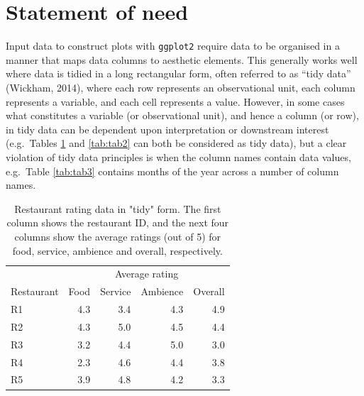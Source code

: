 \documentclass[10pt,a4paper,onecolumn]{article}
\begin{document}
\hypertarget{statement-of-need}{%
\section{Statement of need}\label{statement-of-need}}

Input data to construct plots with \texttt{ggplot2} require data to be
organised in a manner that maps data columns to aesthetic elements. This
generally works well where data is tidied in a long rectangular form,
often referred to as ``tidy data'' (Wickham, 2014), where each row
represents an observational unit, each column represents a variable, and
each cell represents a value. However, in some cases what constitutes a
variable (or observational unit), and hence a column (or row), in tidy
data can be dependent upon interpretation or downstream interest
(e.g.~Tables \ref{tab:tab1} and \ref{tab:tab2} can both be considered as
tidy data), but a clear violation of tidy data principles is when the
column names contain data values, e.g.~Table \ref{tab:tab3} contains
months of the year across a number of column names.

\begin{table}

\caption{\label{tab:tab1}Restaurant rating data in "tidy" form. The first column shows the restaurant ID, and the next four columns show the average ratings (out of 5) for food, service, ambience and overall, respectively.}
\centering
\begin{tabular}[t]{lrrrr}
\toprule
\multicolumn{1}{c}{ } & \multicolumn{4}{c}{Average rating} \\
\cmidrule(l{3pt}r{3pt}){2-5}
Restaurant & Food & Service & Ambience & Overall\\
\midrule
R1 & 4.3 & 3.4 & 4.3 & 4.9\\
R2 & 4.3 & 5.0 & 4.5 & 4.4\\
R3 & 3.2 & 4.4 & 5.0 & 3.0\\
R4 & 2.3 & 4.6 & 4.4 & 3.8\\
R5 & 3.9 & 4.8 & 4.2 & 3.3\\
\bottomrule
\end{tabular}
\end{table}
\end{document}
